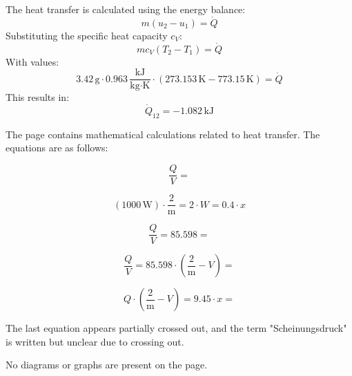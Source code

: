 The heat transfer is calculated using the energy balance:  
\[
m (u_2 - u_1) = \dot{Q}
\]  
Substituting the specific heat capacity \( c_V \):  
\[
m c_V (T_2 - T_1) = \dot{Q}
\]  
With values:  
\[
3.42 \, \text{g} \cdot 0.963 \, \frac{\text{kJ}}{\text{kg·K}} \cdot (273.153 \, \text{K} - 773.15 \, \text{K}) = \dot{Q}
\]  
This results in:  
\[
\dot{Q}_{12} = -1.082 \, \text{kJ}
\]

The page contains mathematical calculations related to heat transfer. The equations are as follows:

\[
\frac{Q}{V} =
\]

\[
(1000 \, \text{W}) \cdot \frac{2}{\text{m}} = 2 \cdot W = 0.4 \cdot x
\]

\[
\frac{Q}{V} = 85.598 =
\]

\[
\frac{Q}{V} = 85.598 \cdot \left( \frac{2}{\text{m}} - V \right) =
\]

\[
Q \cdot \left( \frac{2}{\text{m}} - V \right) = 9.45 \cdot x = 
\]

The last equation appears partially crossed out, and the term "Scheinungsdruck" is written but unclear due to crossing out.

No diagrams or graphs are present on the page.